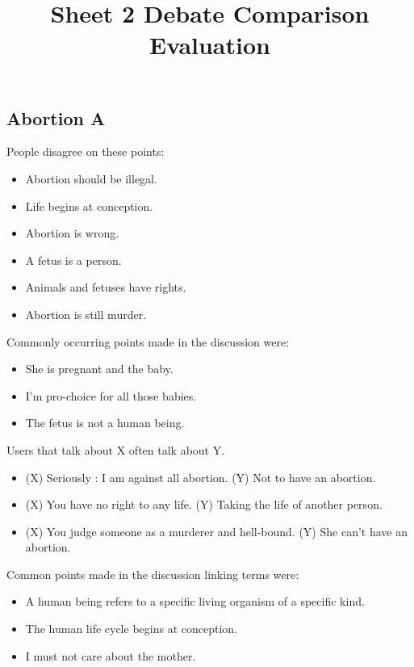 \documentclass[tikz]{article}
\title{\textbf{Sheet 2} Debate Comparison Evaluation\vspace{-9ex}}
\date{}
\begin{document}
  \maketitle

  \begin{multicols}{2}
    \subsection*{Abortion A}
    People disagree on these points:
    \begin{itemize}[noitemsep,nolistsep,label={}]
      \item{Abortion should be illegal.}
      \item{Life begins at conception.}
      \item{Abortion is wrong.}
      \item{A fetus is a person.}
      \item{Animals and fetuses have rights.}
      \item{Abortion is still murder.}
    \end{itemize}

    Commonly occurring points made in the discussion were:
    \begin{itemize}[noitemsep,nolistsep,label={}]
          \item{She is pregnant and the baby.}
          \item{I'm pro-choice for all those babies.}
          \item{The fetus is not a human being.}
    \end{itemize}

    Users that talk about X often talk about Y.
    \begin{itemize}[noitemsep,nolistsep,label={}]
          \item{(X) Seriously : I am against all abortion. (Y) Not to have an abortion.}
          \item{(X) You have no right to any life. (Y) Taking the life of another person.}
          \item{(X) You judge someone as a murderer and hell-bound. (Y) She can't have an abortion.}
    \end{itemize}

    Common points made in the discussion linking terms were:
    \begin{itemize}[noitemsep,nolistsep,label={}]
          \item{A human being refers to a specific living organism of a specific kind.}
          \item{The human life cycle begins at conception.}
          \item{I must not care about the mother.}
    \end{itemize}


\end{multicols}
\end{document}
